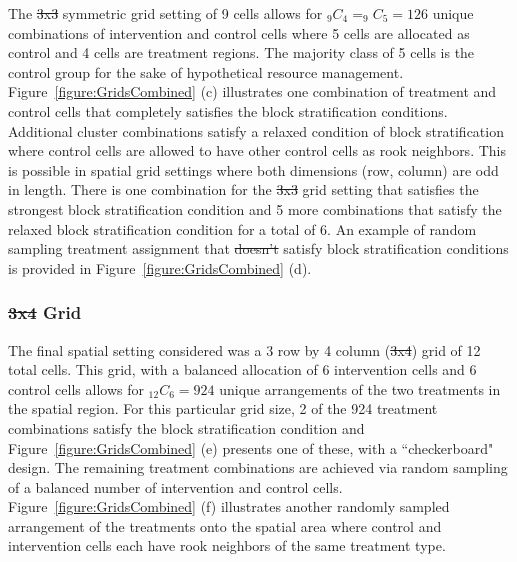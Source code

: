 \documentclass{article}[11pt]
\makeatletter
\providecommand{\DIFaddtex}[1]{{\protect\color{blue}\uwave{#1}}} %
\providecommand{\DIFdeltex}[1]{{\protect\color{red}\sout{#1}}} %
\providecommand{\DIFaddbegin}{} %
\providecommand{\DIFaddend}{} %
\providecommand{\DIFdelbegin}{} %
\providecommand{\DIFdelend}{} %
\providecommand{\DIFadd}[1]{\texorpdfstring{\DIFaddtex{#1}}{#1}} %
\providecommand{\DIFdel}[1]{\texorpdfstring{\DIFdeltex{#1}}{}} %
\providecommand{\DIFscaledelfig}{0.5}
\newlength{\DIFdelgraphicswidth} %
\newlength{\DIFdelgraphicsheight} %
\providecommand{\DIFaddincludegraphics}[2][]{{\color{blue}\fbox{\DIFOincludegraphics[#1]{#2}}}} %
\providecommand{\DIFdelincludegraphics}[2][]{%
\sbox{\DIFdelgraphicsbox}{\DIFOincludegraphics[#1]{#2}}%
\settoboxwidth{\DIFdelgraphicswidth}{\DIFdelgraphicsbox} %
\settoboxtotalheight{\DIFdelgraphicsheight}{\DIFdelgraphicsbox} %
\scalebox{\DIFscaledelfig}{%
\parbox[b]{\DIFdelgraphicswidth}{\usebox{\DIFdelgraphicsbox}\\[-\baselineskip] \rule{\DIFdelgraphicswidth}{0em}}\llap{\resizebox{\DIFdelgraphicswidth}{\DIFdelgraphicsheight}{%
\setlength{\unitlength}{\DIFdelgraphicswidth}%
\begin{picture}(1,1)%
\thicklines\linethickness{2pt} %
{\color[rgb]{1,0,0}\put(0,0){\framebox(1,1){}}}%
{\color[rgb]{1,0,0}\put(0,0){\line( 1,1){1}}}%
{\color[rgb]{1,0,0}\put(0,1){\line(1,-1){1}}}%
\end{picture}%
}\hspace*{3pt}}} %
} %
\DeclareRobustCommand{\DIFaddbegin}{\DIFOaddbegin \let\includegraphics\DIFaddincludegraphics} %
\DeclareRobustCommand{\DIFaddend}{\DIFOaddend \let\includegraphics\DIFOincludegraphics} %
\DeclareRobustCommand{\DIFdelbegin}{\DIFOdelbegin \let\includegraphics\DIFdelincludegraphics} %
\DeclareRobustCommand{\DIFdelend}{\DIFOaddend \let\includegraphics\DIFOincludegraphics} %
\let\sout@orig\sout %
\renewcommand{\sout}[1]{\ifmmode\text{\sout@orig{\ensuremath{#1}}}\else\sout@orig{#1}\fi} %
\makeatother
\begin{document}
The \DIFdelbegin \DIFdel{3x3 }\DIFdelend \DIFaddbegin \DIFadd{$3\times3$ }\DIFaddend symmetric grid setting of 9 cells allows for %
$_{9}C_{4}=_{9}C_{5}=126$ unique combinations of intervention and control cells where 5 cells are allocated as control and 4 cells are treatment regions. The majority class of 5 cells is the control group for the sake of hypothetical resource management. Figure~\ref{figure:GridsCombined} (c) illustrates one combination of treatment and control cells that completely satisfies the block stratification conditions. Additional cluster combinations satisfy a relaxed condition of block stratification where control cells are allowed to have other control cells as rook neighbors. This is possible in spatial grid settings where both dimensions (row, column) are odd in length. There is one combination for the \DIFdelbegin \DIFdel{3x3 }\DIFdelend \DIFaddbegin \DIFadd{$3\times3$ }\DIFaddend grid setting that satisfies the strongest block stratification condition and 5 more combinations that satisfy the relaxed block stratification condition for a total of 6. An example of random sampling treatment assignment that \DIFdelbegin \DIFdel{doesn't }\DIFdelend \DIFaddbegin \DIFadd{does not }\DIFaddend satisfy block stratification conditions is provided in Figure~\ref{figure:GridsCombined} (d).

\subsubsection{\DIFdelbegin \DIFdel{3x4 }\DIFdelend \DIFaddbegin \DIFadd{$3\times4$ }\DIFaddend Grid}

The final spatial setting considered was a 3 row by 4 column (\DIFdelbegin \DIFdel{3x4}\DIFdelend \DIFaddbegin \DIFadd{$3\times4$}\DIFaddend ) grid of 12 total cells. This grid, with a balanced allocation of 6 intervention cells and 6 control cells allows for %
$_{12}C_{6}=924$ unique arrangements of the two treatments in the spatial region. For this particular grid size, 2 of the 924 treatment combinations satisfy the block stratification condition and Figure~\ref{figure:GridsCombined} (e) presents one of these, with a ``checkerboard" design. The remaining treatment combinations are achieved via random sampling of a balanced number of intervention and control cells. Figure~\ref{figure:GridsCombined} (f) illustrates another randomly sampled arrangement of the treatments onto the spatial area where control and intervention cells each have rook neighbors of the same treatment type.
\end{document}

